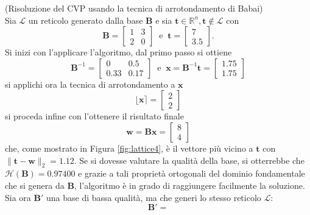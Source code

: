 \begin{exmp} (Risoluzione del CVP usando la tecnica di arrotondamento di Babai)
    \label{exp:babai}
    \\
    Sia $\mathcal{L}$ un reticolo generato dalla base $\mathbf{B}$ 
    e sia $\mathbf{t} \in \mathbb{R}^n, \mathbf{t} \notin \mathcal{L}$ con
    \[
        \mathbf{B} =
        \begin{bmatrix}
            1 & 3\\
            2 & 0
        \end{bmatrix}
        \ \text{ e } \ \mathbf{t} =
        \begin{bmatrix}
            7\\
            3.5
        \end{bmatrix}.
    \]
    Si inizi con l'applicare l'algoritmo, dal primo passo si ottiene
    \[
        \mathbf{B}^{-1} =
        \begin{bmatrix}
            0 & 0.5\\
            0.33 & 0.17
        \end{bmatrix}
        \ \text{ e } \ \mathbf{x} = \mathbf{B}^{-1}\mathbf{t} = 
        \begin{bmatrix}
            1.75\\
            1.75
        \end{bmatrix}
    \]
    si applichi ora la tecnica di arrotondamento a $\mathbf{x}$
    \[
        \lfloor\mathbf{x}\rceil = 
        \begin{bmatrix}
            2\\
            2
        \end{bmatrix}
    \]
    si proceda infine con l'ottenere il risultato finale
    \[
        \mathbf{w} = \mathbf{B}\mathbf{x} =
        \begin{bmatrix}
            8\\
            4
        \end{bmatrix}
    \]  
    che, come mostrato in Figura \ref*{fig:lattice4}, è il vettore più vicino
    a $\mathbf{t}$ con $\|\mathbf{t}-\mathbf{w}\|_2 = 1.12$. Se si dovesse valutare la qualità della base, si otterrebbe che 
    $\mathcal{H}(\mathbf{B}) = 0.97400$ e grazie a tali proprietà ortogonali del dominio fondamentale
    che si genera da $\mathbf{B}$, l'algoritmo è in grado di raggiungere facilmente la soluzione.
    \\
    Sia ora $\mathbf{B}'$ una base di bassa qualità, ma che generi lo stesso reticolo 
    $\mathcal{L}$:
    \[
        \mathbf{B}' =
\]
\end{exmp}
